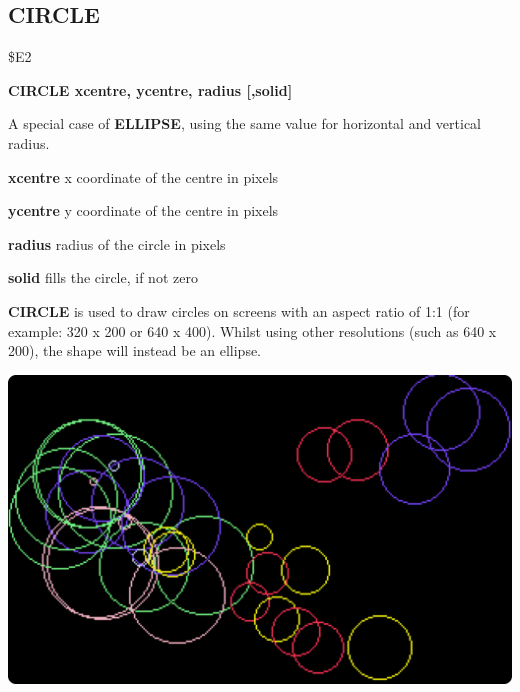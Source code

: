 \subsection{CIRCLE}
\begin{description}[leftmargin=2cm,style=nextline]
\item [Token:] \$E2
\item [Format:] {\bf CIRCLE xcentre, ycentre, radius [,solid]}
\item [Usage:] A special case of
               {\bf ELLIPSE}, using the same value for
               horizontal and vertical radius.

               {\bf xcentre} x coordinate of the centre in pixels

               {\bf ycentre} y coordinate of the centre in pixels

               {\bf radius} radius of the circle in pixels

               {\bf solid} fills the circle, if not zero

\item [Remarks:] {\bf CIRCLE} is used to draw circles on
               screens with an aspect ratio of 1:1 (for example: 320 x 200
               or 640 x 400). Whilst using other resolutions (such as 640 x 200),
               the shape will instead be an ellipse.

\item \begin{center}\includegraphics[width=\linewidth]{images/circle.png}\end{center}
\newpage


\end{description}
